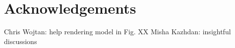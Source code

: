 \section*{Acknowledgements}

Chris Wojtan: help rendering model in Fig. XX
Misha Kazhdan: insightful discussions